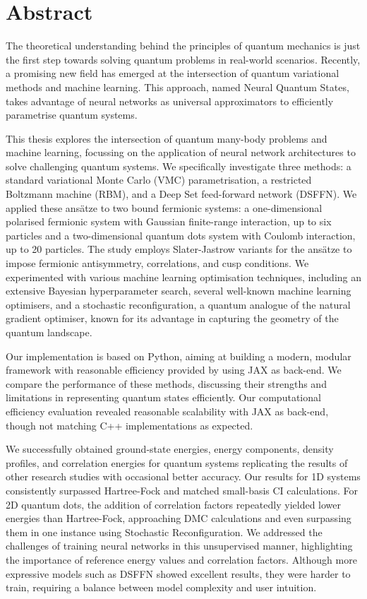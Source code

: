 \section*{Abstract}

The theoretical understanding behind the principles of quantum mechanics is just the first step towards solving quantum problems in real-world scenarios. Recently, a promising new field has emerged at the intersection of quantum variational methods and machine learning. This approach, named Neural Quantum States, takes advantage of neural networks as universal approximators to efficiently parametrise quantum systems.

This thesis explores the intersection of quantum many-body problems and machine learning, focussing on the application of neural network architectures to solve challenging quantum systems. We specifically investigate three methods: a standard variational Monte Carlo (VMC) parametrisation, a restricted Boltzmann machine (RBM), and a Deep Set feed-forward network (DSFFN). We applied these ansätze to two bound fermionic systems: a one-dimensional polarised fermionic system with Gaussian finite-range interaction, up to six particles and a two-dimensional quantum dots system with Coulomb interaction, up to 20 particles. The study employs Slater-Jastrow variants for the ansätze to impose fermionic antisymmetry, correlations, and cusp conditions. We experimented with various machine learning optimisation techniques, including an extensive Bayesian hyperparameter search, several well-known machine learning optimisers, and a stochastic reconfiguration, a quantum analogue of the natural gradient optimiser, known for its advantage in capturing the geometry of the quantum landscape.

Our implementation is based on Python, aiming at building a modern, modular framework with reasonable efficiency provided by using JAX as back-end. We compare the performance of these methods, discussing their strengths and limitations in representing quantum states efficiently. Our computational efficiency evaluation revealed reasonable scalability with JAX as back-end, though not matching C++ implementations as expected.

We successfully obtained ground-state energies, energy components, density profiles, and correlation energies for quantum systems replicating the results of other research studies with occasional better accuracy. Our results for 1D systems consistently surpassed Hartree-Fock and matched small-basis CI calculations. For 2D quantum dots, the addition of correlation factors repeatedly yielded lower energies than Hartree-Fock, approaching DMC calculations and even surpassing them in one instance using Stochastic Reconfiguration. We addressed the challenges of training neural networks in this unsupervised manner, highlighting the importance of reference energy values and correlation factors. Although more expressive models such as DSFFN showed excellent results, they were harder to train, requiring a balance between model complexity and user intuition. 



